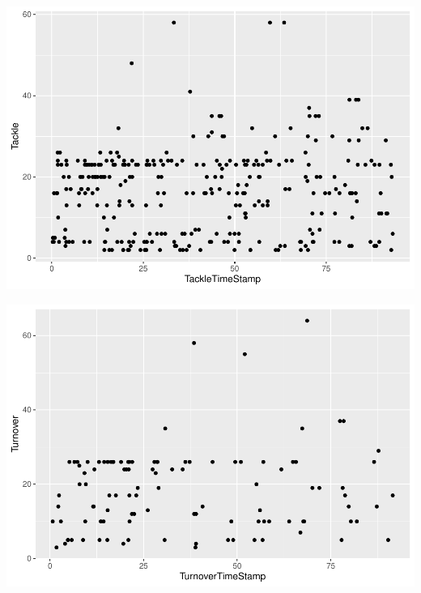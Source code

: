 \documentclass[]{article}
\newenvironment{Shaded}{\begin{snugshade}}{\end{snugshade}}
\newcommand{\DecValTok}[1]{\textcolor[rgb]{0.00,0.00,0.81}{#1}}
\newcommand{\KeywordTok}[1]{\textcolor[rgb]{0.13,0.29,0.53}{\textbf{#1}}}
\newcommand{\NormalTok}[1]{#1}
\newcommand{\OperatorTok}[1]{\textcolor[rgb]{0.81,0.36,0.00}{\textbf{#1}}}
\newcommand{\StringTok}[1]{\textcolor[rgb]{0.31,0.60,0.02}{#1}}
\begin{document}
\includegraphics{GraphAnalysis_files/figure-latex/Tackle Game Duration-1.pdf}

\begin{Shaded}
\end{Shaded}

\includegraphics{GraphAnalysis_files/figure-latex/Turnover Game Duration-1.pdf}

\begin{Shaded}
\end{Shaded}
\end{document}
